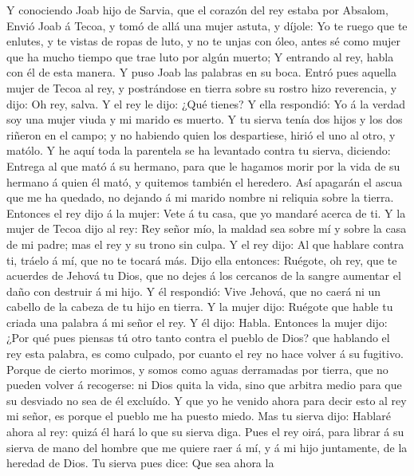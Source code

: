  Y conociendo Joab hijo de Sarvia, que el corazón del rey
estaba por Absalom,  Envió Joab á Tecoa, y tomó de allá una
mujer astuta, y díjole: Yo te ruego que te enlutes, y te vistas de ropas
de luto, y no te unjas con óleo, antes sé como mujer que ha mucho tiempo
que trae luto por algún muerto;  Y entrando al rey, habla
con él de esta manera. Y puso Joab las palabras en su boca. 
Entró pues aquella mujer de Tecoa al rey, y postrándose en tierra sobre
su rostro hizo reverencia, y dijo: Oh rey, salva.  Y el rey
le dijo: ¿Qué tienes? Y ella respondió: Yo á la verdad soy una mujer
viuda y mi marido es muerto.  Y tu sierva tenía dos hijos y
los dos riñeron en el campo; y no habiendo quien los despartiese, hirió
el uno al otro, y matólo.  Y he aquí toda la parentela se ha
levantado contra tu sierva, diciendo: Entrega al que mató á su hermano,
para que le hagamos morir por la vida de su hermano á quien él mató, y
quitemos también el heredero. Así apagarán el ascua que me ha quedado,
no dejando á mi marido nombre ni reliquia sobre la tierra. 
Entonces el rey dijo á la mujer: Vete á tu casa, que yo mandaré acerca
de ti.  Y la mujer de Tecoa dijo al rey: Rey señor mío, la
maldad sea sobre mí y sobre la casa de mi padre; mas el rey y su trono
sin culpa.  Y el rey dijo: Al que hablare contra ti, tráelo
á mí, que no te tocará más.  Dijo ella entonces: Ruégote,
oh rey, que te acuerdes de Jehová tu Dios, que no dejes á los cercanos
de la sangre aumentar el daño con destruir á mi hijo. Y él respondió:
Vive Jehová, que no caerá ni un cabello de la cabeza de tu hijo en
tierra.  Y la mujer dijo: Ruégote que hable tu criada una
palabra á mi señor el rey. Y él dijo: Habla.  Entonces la
mujer dijo: ¿Por qué pues piensas tú otro tanto contra el pueblo de
Dios? que hablando el rey esta palabra, es como culpado, por cuanto el
rey no hace volver á su fugitivo.  Porque de cierto
morimos, y somos como aguas derramadas por tierra, que no pueden volver
á recogerse: ni Dios quita la vida, sino que arbitra medio para que su
desviado no sea de él excluído.  Y que yo he venido ahora
para decir esto al rey mi señor, es porque el pueblo me ha puesto miedo.
Mas tu sierva dijo: Hablaré ahora al rey: quizá él hará lo que su sierva
diga.  Pues el rey oirá, para librar á su sierva de mano
del hombre que me quiere raer á mí, y á mi hijo juntamente, de la
heredad de Dios.  Tu sierva pues dice: Que sea ahora la
